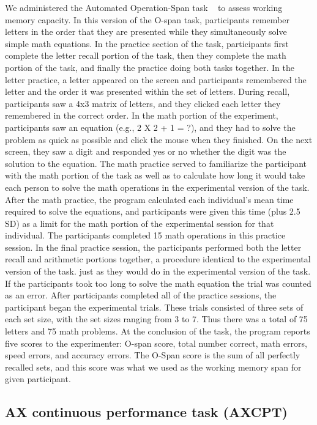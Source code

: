 We administered the Automated Operation-Span task ~\citep{Unsworth2005} to assess working memory capacity. In this version of the O-span task, participants remember letters in the order that they are presented while they simultaneously solve simple math equations. In the practice section of the task, participants first complete the letter recall portion of the task, then they complete the math portion of the task, and finally the practice doing both tasks together. In the letter practice, a letter appeared on the screen and participants remembered the letter and the order it was presented within the set of letters. During recall, participants saw a 4x3 matrix of letters, and they clicked each letter they remembered in the correct order. In the math portion of the experiment, participants saw an equation (e.g., 2 X 2 + 1 = ?), and they had to solve the problem as quick as possible and click the mouse when they finished. On the next screen, they saw a digit and responded yes or no whether the digit was the solution to the equation. The math practice served to familiarize the participant with the math portion of the task as well as to calculate how long it would take each person to solve the math operations in the experimental version of the task. After the math practice, the program calculated each individual's mean time required to solve the equations, and participants were given this time (plus 2.5 SD) as a limit for the math portion of the experimental session for that individual. The participants completed 15 math operations in this practice session. In the final practice session, the participants performed both the letter recall and arithmetic portions together, a procedure identical to the experimental version of the task. just as they would do in the experimental version of the task. If the participants took too long to solve the math equation the trial was counted as an error. After participants completed all of the practice sessions, the participant began the experimental trials. These trials consisted of three sets of each set size, with the set sizes ranging from 3 to 7. Thus there was a total of 75 letters and 75 math problems. At the conclusion of the task, the program reports five scores to the experimenter: O-span score, total number correct, math errors, speed errors, and accuracy errors. The O-Span score is the sum of all perfectly recalled sets, and this score was what we used as the working memory span for given participant. 

\subsection{AX continuous performance task (AXCPT)}
\label{axcontinuousperformancetaskaxcpt}

